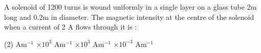 \item A solenoid of 1200 turns is wound uniformly in a single layer on a glass tube 2m long and 0.2m in diameter. The magnetic intensity at the centre of the solenoid when a current of 2 A flows through it is :
    \begin{tasks}(2)
         Am$^{-1}$
        $\times 10^3$ Am$^{-1}$
        $\times 10^3$ Am$^{-1}$
        $\times 10^{-3}$ Am$^{-1}$
    \end{tasks}